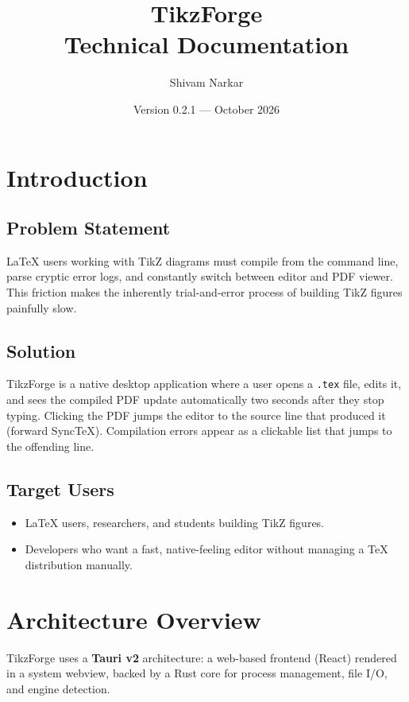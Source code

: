 \documentclass[11pt,a4paper]{report}
\title{\textbf{TikzForge}\\[4pt]\large Technical Documentation}
\author{Shivam Narkar}
\date{Version 0.2.1 — October 2026}
\begin{document}
\maketitle
\tableofcontents
\newpage

\chapter{Introduction}

\section{Problem Statement}
LaTeX users working with TikZ diagrams must compile from the command line, parse cryptic error logs, and constantly switch between editor and PDF viewer. This friction makes the inherently trial-and-error process of building TikZ figures painfully slow.

\section{Solution}
TikzForge is a native desktop application where a user opens a \texttt{.tex} file, edits it, and sees the compiled PDF update automatically two seconds after they stop typing. Clicking the PDF jumps the editor to the source line that produced it (forward SyncTeX). Compilation errors appear as a clickable list that jumps to the offending line.

\section{Target Users}
\begin{itemize}
  \item LaTeX users, researchers, and students building TikZ figures.
  \item Developers who want a fast, native-feeling editor without managing a TeX distribution manually.
\end{itemize}

\chapter{Architecture Overview}

TikzForge uses a \textbf{Tauri v2} architecture: a web-based frontend (React) rendered in a system webview, backed by a Rust core for process management, file I/O, and engine detection.
\end{document}

